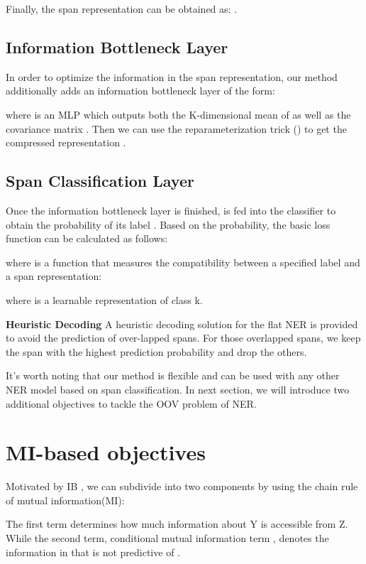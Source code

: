 \documentclass[11pt]{article}
\begin{document}
Finally, the span representation can be obtained as: .

\subsection{Information Bottleneck Layer}
In order to optimize the information in the span representation, our method additionally adds an information bottleneck layer of the form:

where  is an MLP which outputs both the K-dimensional mean  of  as well as the  covariance matrix . Then we 
can use the reparameterization trick (\cite{kingma2013auto}) to get the compressed representation .


\subsection{Span Classification Layer}
Once the information bottleneck layer is finished,  is fed into the classifier to obtain the probability of its label . Based on the probability, the basic loss function can be calculated as follows:

where  is a function that measures the compatibility between a specified label and a span representation:

where  is a learnable representation of class k.

\textbf{Heuristic Decoding}  A heuristic decoding solution for the flat NER is provided to avoid the prediction of over-lapped spans. For those overlapped spans, we keep the span with the highest prediction probability and drop the others.

It's worth noting that our method is flexible and can be used with any other NER model based on span classification. In next section, we will introduce two additional objectives to tackle the OOV problem of NER.




\section{MI-based objectives}\label{MINER}
Motivated by IB \cite{tishby2000information,federici2020learning}, we can subdivide  into two components by using the chain rule of mutual information(MI):



The first term determines how much information about Y is accessible from Z. While the second term, conditional mutual information term , denotes the information in  that is not predictive of . 
\end{document}
